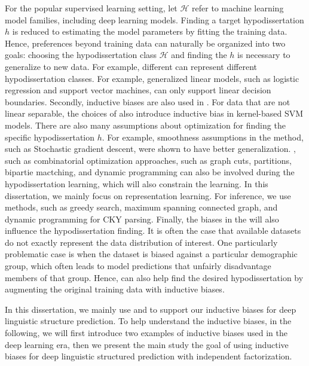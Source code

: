 For the popular supervised learning setting, let $\mathcal{H}$ refer
to machine learning model families, including deep learning
models. Finding a target hypodissertation $h$ is reduced to estimating the
model parameters by fitting the training data. Hence, preferences
beyond training data can naturally be organized into two goals:
choosing the hypodissertation class $\mathcal{H}$ and finding the $h$ is
necessary to generalize to new data. For example, different  can represent different hypodissertation classes. For example,
generalized linear models, such as logistic regression and support
vector machines, can only support linear decision
boundaries. Secondly, inductive biases are also used in . For data that are not linear separable, the choices of
 also introduce inductive bias in kernel-based
SVM models. There are also many assumptions about optimization for
finding the specific hypodissertation $h$. For example, smoothness
assumptions in the  method, such as Stochastic
gradient descent, were shown to have better
generalization. , such as combinatorial
optimization approaches, such as graph cuts, partitions, bipartie
mactching, and dynamic programming can also be involved during the
hypodissertation learning, which will also constrain the learning. In this
dissertation, we mainly focus on representation learning. For
inference, we use methods, such as greedy search, maximum spanning
connected graph, and dynamic programming for CKY parsing. Finally, the
biases in the  will also influence the hypodissertation
finding. It is often the case that available datasets do not exactly
represent the data distribution of interest. One particularly
problematic case is when the dataset is biased against a particular
demographic group, which often leads to model predictions that
unfairly disadvantage members of that group. Hence,  can also help find the desired hypodissertation by
augmenting the original training data with inductive biases.

In this dissertation, we mainly use  and  to support our inductive biases for deep linguistic
structure prediction. To help understand the inductive biases, in
the following, we will first introduce two examples of inductive
biases used in the deep learning era, then we present the main study
the goal of using inductive biases for deep linguistic structured
prediction with independent factorization.

